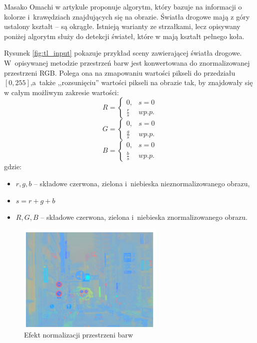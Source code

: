Masako Omachi w artykule \cite{T4} proponuje algorytm, który bazuje na informacji o kolorze i~krawędziach znajdujących się na obrazie. 
Światła drogowe mają z góry ustalony kształt -- są okrągłe. 
Istnieją warianty ze strzałkami, lecz opisywany poniżej algorytm służy do detekcji świateł, które w \cite{Kodeks} mają kształt pełnego koła.

Rysunek \ref{fig:tl_input} pokazuje przykład sceny zawierającej światła drogowe. 
W~opisywanej metodzie przestrzeń barw jest konwertowana do znormalizowanej przestrzeni RGB. 
Polega ona na zmapowaniu wartości pikseli do przedziału $[0,255]$,a~także ,,rozsunięciu'' wartości pikseli na obrazie tak, by znajdowały się w całym możliwym zakresie wartości:
\begin{equation}
R=\left\{\begin{matrix}
0, &  s=0\\
\frac{r}{s} & w p.p.
\end{matrix}\right.
\end{equation}
\begin{equation}
G=\left\{\begin{matrix}
0, &  s=0\\
\frac{g}{s} & w p.p.
\end{matrix}\right.
\end{equation}
\begin{equation}
B=\left\{\begin{matrix}
0, &  s=0\\
\frac{b}{s} & w p.p.
\end{matrix}\right.
\end{equation}
gdzie:
\begin{itemize}
\item$r,g,b$ -- składowe czerwona, zielona i~niebieska nieznormalizowanego obrazu,
\item$s = r+g+b$
\item$R,G,B$ -- składowe czerwona, zielona i~niebieska znormalizowanego obrazu.
\end{itemize}


\begin{figure}
  \centering
  \includegraphics[width=7cm]{img/tl_norm.png}
  \caption{Efekt normalizacji przestrzeni barw\cite{T4}}
  \label{fig:tl_norm}
\end{figure}

